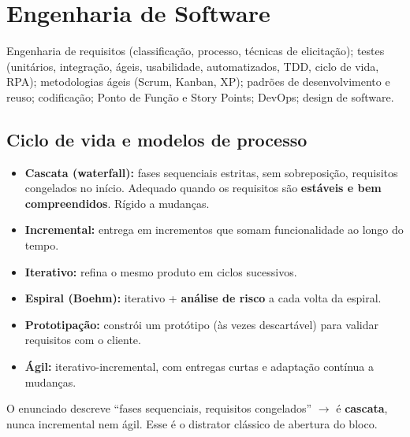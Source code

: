 \chapter{Engenharia de Software}
\label{cap:eng-software}

\begin{edital}
Engenharia de requisitos (classificação, processo, técnicas de elicitação);
testes (unitários, integração, ágeis, usabilidade, automatizados, TDD, ciclo
de vida, RPA); metodologias ágeis (Scrum, Kanban, XP); padrões de
desenvolvimento e reuso; codificação; Ponto de Função e Story Points; DevOps;
design de software.
\end{edital}

\section{Ciclo de vida e modelos de processo}

\begin{conceito}
\begin{itemize}
\item \textbf{Cascata (waterfall):} fases sequenciais estritas, sem
sobreposição, requisitos congelados no início. Adequado quando os requisitos
são \textbf{estáveis e bem compreendidos}. Rígido a mudanças.
\item \textbf{Incremental:} entrega em incrementos que somam funcionalidade
ao longo do tempo.
\item \textbf{Iterativo:} refina o mesmo produto em ciclos sucessivos.
\item \textbf{Espiral (Boehm):} iterativo + \textbf{análise de risco} a cada
volta da espiral.
\item \textbf{Prototipação:} constrói um protótipo (às vezes descartável)
para validar requisitos com o cliente.
\item \textbf{Ágil:} iterativo-incremental, com entregas curtas e adaptação
contínua a mudanças.
\end{itemize}
\end{conceito}

\begin{pegadinha}
O enunciado descreve ``fases sequenciais, requisitos congelados'' $\to$ é
\textbf{cascata}, nunca incremental nem ágil. Esse é o distrator clássico de
abertura do bloco.
\end{pegadinha}

